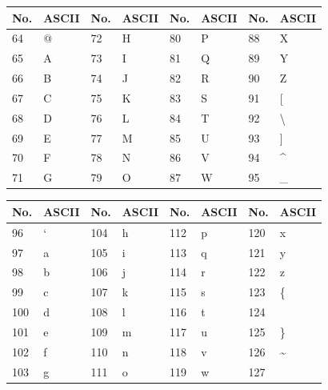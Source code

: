 \documentclass[10pt,landscape,twocolumn,a4paper,notitlepage]{article}
\begin{document}
		
		\begin{table}[H]
			\begin{tabular}{|l|l|l|l|l|l|l|l|}
				\hline \textbf{No.} & \textbf{ASCII} & \textbf{No.} & \textbf{ASCII}  &
					\textbf{No.} & \textbf{ASCII} & \textbf{No.} & \textbf{ASCII} \\ \hline
				64 & @ & 72 & H & 80 & P & 88 & X \\ \hline
				65 & A & 73 & I & 81 & Q & 89 & Y \\ \hline
				66 & B & 74 & J & 82 & R & 90 & Z \\ \hline
				67 & C & 75 & K & 83 & S & 91 & [ \\ \hline
				68 & D & 76 & L & 84 & T & 92 & \textbackslash \\ \hline
				69 & E & 77 & M & 85 & U & 93 & ] \\ \hline
				70 & F & 78 & N & 86 & V & 94 & \textasciicircum \\ \hline
				71 & G & 79 & O & 87 & W & 95 & \_ \\ \hline
			\end{tabular}
		\end{table}
		
		\begin{table}[H]
			\begin{tabular}{|l|l|l|l|l|l|l|l|}
				\hline \textbf{No.} & \textbf{ASCII} & \textbf{No.} & \textbf{ASCII}  &
					\textbf{No.} & \textbf{ASCII} & \textbf{No.} & \textbf{ASCII} \\ \hline
				96 & ` & 104 & h & 112 & p & 120 & x \\ \hline
				97 & a & 105 & i & 113 & q & 121 & y \\ \hline
				98 & b & 106 & j & 114 & r & 122 & z \\ \hline
				99 & c & 107 & k & 115 & s & 123 & \{ \\ \hline
				100 & d & 108 & l & 116 & t & 124 & \textbar \\ \hline
				101 & e & 109 & m & 117 & u & 125 & \} \\ \hline
				102 & f & 110 & n & 118 & v & 126 & \textasciitilde \\ \hline
				103 & g &  111 & o & 119 & w & 127 &  \\ \hline
			\end{tabular}
		\end{table}
		
\end{document}
